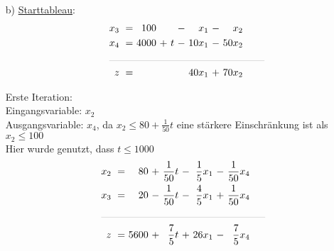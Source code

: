 \documentclass [a4paper,11pt]{article}
\begin{document}
\begin{enumerate}
\begin{enumerate}
\begin{enumerate}
            \end{enumerate}
            \item[b)]
                \underline{Starttableau}:
                \begin{align*}
                \begin{alignedat}{6}
                && x_3 &\ = &\  100 &    &    &\ - &\   x_1 &\ - &\   x_2 \\
                && x_4 &\ = &\ 4000 &\ + &\ t &\ - &\ 10x_1 &\ - &\ 50x_2 \\
                &\rlap{\rule{5.5cm}{.1pt}} &&&&&&&&&\\
                && z   &\ = &       &    &    &    &\ 40x_1 &\ + &\ 70x_2
                \end{alignedat}
                \end{align*}

                Erste Iteration:\\
                Eingangsvariable: $x_2$\\
                Ausgangsvariable: $x_4$, da $x_2 \leq 80 + \frac{1}{50}t$ eine stärkere Einschränkung ist als $x_2 \leq 100$\\
                Hier wurde genutzt, dass $t \leq 1000$
                \begin{align*}
                \begin{alignedat}{6}
                && x_2 &\ = &\   80 &\ + &\ \frac{1}{50}t &\ - &\ \frac{1}{5}x_1 &\ - &\ \frac{1}{50}x_4 \\
                && x_3 &\ = &\   20 &\ - &\ \frac{1}{50}t &\ - &\ \frac{4}{5}x_1 &\ + &\ \frac{1}{50}x_4 \\
                &\rlap{\rule{5.8cm}{.1pt}} &&&&&&&&&\\
                && z   &\ = &\ 5600 &\ + &\ \frac{7}{5}t &\ + &\ 26x_1 &\ - &\ \frac{7}{5}x_4
                \end{alignedat}
                \end{align*}


\end{enumerate}
\end{enumerate}
\end{document}

